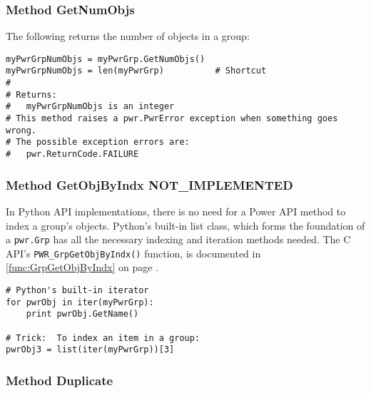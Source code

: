 \documentclass[12pt]{report} %
\begin{document}
\begin{appendices}
\subsubsection{Method GetNumObjs} \label{meth:GetNumObjs}

The following returns the number of objects in a group:

\begin{center}\begin{minipage}{.95\linewidth}\begin{lstlisting}
myPwrGrpNumObjs = myPwrGrp.GetNumObjs()
myPwrGrpNumObjs = len(myPwrGrp)          # Shortcut
#
# Returns:
#   myPwrGrpNumObjs is an integer
# This method raises a pwr.PwrError exception when something goes wrong.
# The possible exception errors are:
#   pwr.ReturnCode.FAILURE
\end{lstlisting}\end{minipage}\end{center}

\subsubsection{Method GetObjByIndx NOT_IMPLEMENTED} \label{meth:GetObjByIndx}

In Python API implementations, there is no need for a Power API method to index
a group's objects. Python's built-in list class, which forms the foundation of
a \texttt{pwr.Grp} has all the necessary indexing and iteration methods needed.
The C API's \texttt{PWR_GrpGetObjByIndx()} function, is documented in
\ref{func:GrpGetObjByIndx} on page \pageref{func:GrpGetObjByIndx}.

\begin{center}\begin{minipage}{.95\linewidth}\begin{lstlisting}
# Python's built-in iterator
for pwrObj in iter(myPwrGrp):
    print pwrObj.GetName()

# Trick:  To index an item in a group:
pwrObj3 = list(iter(myPwrGrp))[3]
\end{lstlisting}\end{minipage}\end{center}


\subsubsection{Method Duplicate} \label{meth:Duplicate}


\end{appendices}
\end{document}
